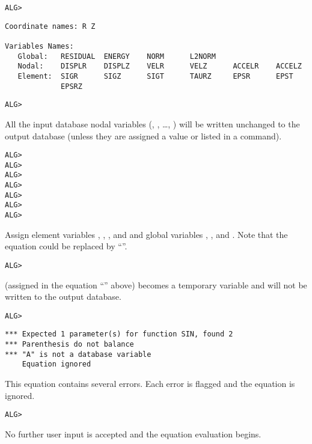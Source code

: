 \verb|ALG>| 
\begin{verbatim}
Coordinate names: R Z

Variables Names:
   Global:   RESIDUAL  ENERGY    NORM      L2NORM
   Nodal:    DISPLR    DISPLZ    VELR      VELZ      ACCELR    ACCELZ
   Element:  SIGR      SIGZ      SIGT      TAURZ     EPSR      EPST
             EPSRZ
\end{verbatim}

\verb|ALG>| 

\begin{comments}
All the input database nodal variables (, , \ldots,
) will be written unchanged to the output database (unless
they are assigned a value or listed in a  command).
\end{comments}

\newpage
\verb|ALG>|
 \\
\verb|ALG>|
 \\
\verb|ALG>|
 \\
\verb|ALG>|
 \\
\verb|ALG>|
 \\
\verb|ALG>|
 \\
\verb|ALG>|

\begin{comments}
Assign element variables , , , and
 and global variables , , and
. Note that the  equation could be replaced by
``''.
\end{comments}

\verb|ALG>| 

\begin{comments}
 (assigned in the equation ``'' above)
becomes a temporary variable and will not be written to the output
database.
\end{comments}

\verb|ALG>| 
\vspace{-\medskipamount}
\begin{verbatim}
*** Expected 1 parameter(s) for function SIN, found 2
*** Parenthesis do not balance
*** "A" is not a database variable
    Equation ignored
\end{verbatim}

\begin{comments}
This equation contains several errors. Each error is flagged and the
equation is ignored.
\end{comments}

\verb|ALG>| 

\begin{comments}
No further user input is accepted and the equation evaluation
begins.
\end{comments}
